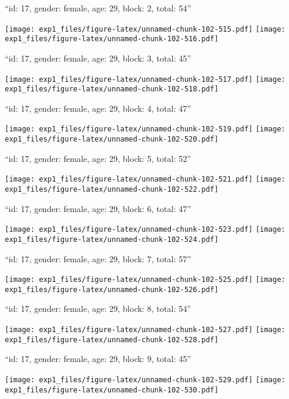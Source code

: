\documentclass[11pt,,]{article}
\begin{document}
\newpage
[1] 

``id: 17, gender: female, age: 29, block: 2, total: 54''

\texttt{[image: exp1\_files/figure-latex/unnamed-chunk-102-515.pdf]}
\texttt{[image: exp1\_files/figure-latex/unnamed-chunk-102-516.pdf]}

\newpage
[1] 

``id: 17, gender: female, age: 29, block: 3, total: 45''

\texttt{[image: exp1\_files/figure-latex/unnamed-chunk-102-517.pdf]}
\texttt{[image: exp1\_files/figure-latex/unnamed-chunk-102-518.pdf]}

\newpage
[1] 

``id: 17, gender: female, age: 29, block: 4, total: 47''

\texttt{[image: exp1\_files/figure-latex/unnamed-chunk-102-519.pdf]}
\texttt{[image: exp1\_files/figure-latex/unnamed-chunk-102-520.pdf]}

\newpage
[1] 

``id: 17, gender: female, age: 29, block: 5, total: 52''

\texttt{[image: exp1\_files/figure-latex/unnamed-chunk-102-521.pdf]}
\texttt{[image: exp1\_files/figure-latex/unnamed-chunk-102-522.pdf]}

\newpage
[1] 

``id: 17, gender: female, age: 29, block: 6, total: 47''

\texttt{[image: exp1\_files/figure-latex/unnamed-chunk-102-523.pdf]}
\texttt{[image: exp1\_files/figure-latex/unnamed-chunk-102-524.pdf]}

\newpage
[1] 

``id: 17, gender: female, age: 29, block: 7, total: 57''

\texttt{[image: exp1\_files/figure-latex/unnamed-chunk-102-525.pdf]}
\texttt{[image: exp1\_files/figure-latex/unnamed-chunk-102-526.pdf]}

\newpage
[1] 

``id: 17, gender: female, age: 29, block: 8, total: 54''

\texttt{[image: exp1\_files/figure-latex/unnamed-chunk-102-527.pdf]}
\texttt{[image: exp1\_files/figure-latex/unnamed-chunk-102-528.pdf]}

\newpage
[1] 

``id: 17, gender: female, age: 29, block: 9, total: 45''

\texttt{[image: exp1\_files/figure-latex/unnamed-chunk-102-529.pdf]}
\texttt{[image: exp1\_files/figure-latex/unnamed-chunk-102-530.pdf]}
\end{document}
